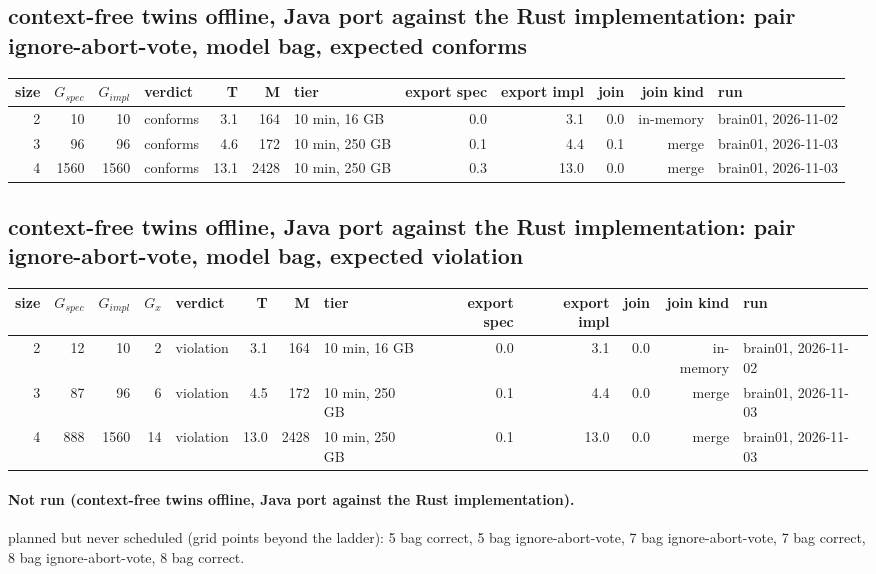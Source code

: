 \documentclass[10pt]{article}
\begin{document}
\subsection*{context-free twins offline, Java port against the Rust implementation: pair \textsf{ignore-abort-vote}, model bag, expected conforms}
\begin{longtable}{@{}rrrlrrlrrrrl@{}}
\toprule
size & $G_{\mathit{spec}}$ & $G_{\mathit{impl}}$ & verdict & T & M & tier & export spec & export impl & join & join kind & run \\
\midrule
\endhead
\color{red} 2 & 10 & 10 & conforms & 3.1 & 164 & 10 min, 16 GB & 0.0 & 3.1 & 0.0 & in-memory & brain01, 2026-11-02 \\
\color{blue} 3 & 96 & 96 & conforms & 4.6 & 172 & 10 min, 250 GB & 0.1 & 4.4 & 0.1 & merge & brain01, 2026-11-03 \\
\color{blue} 4 & 1560 & 1560 & conforms & 13.1 & 2428 & 10 min, 250 GB & 0.3 & 13.0 & 0.0 & merge & brain01, 2026-11-03 \\
\bottomrule
\end{longtable}
\subsection*{context-free twins offline, Java port against the Rust implementation: pair \textsf{ignore-abort-vote}, model bag, expected violation}
\begin{longtable}{@{}rrrrlrrlrrrrl@{}}
\toprule
size & $G_{\mathit{spec}}$ & $G_{\mathit{impl}}$ & $G_x$ & verdict & T & M & tier & export spec & export impl & join & join kind & run \\
\midrule
\endhead
\color{red} 2 & 12 & 10 & 2 & violation & 3.1 & 164 & 10 min, 16 GB & 0.0 & 3.1 & 0.0 & in-memory & brain01, 2026-11-02 \\
\color{blue} 3 & 87 & 96 & 6 & violation & 4.5 & 172 & 10 min, 250 GB & 0.1 & 4.4 & 0.0 & merge & brain01, 2026-11-03 \\
\color{blue} 4 & 888 & 1560 & 14 & violation & 13.0 & 2428 & 10 min, 250 GB & 0.1 & 13.0 & 0.0 & merge & brain01, 2026-11-03 \\
\bottomrule
\end{longtable}
\paragraph{Not run (context-free twins offline, Java port against the Rust implementation).}
planned but never scheduled (grid points beyond the ladder): 5 bag correct, 5 bag ignore-abort-vote, 7 bag ignore-abort-vote, 7 bag correct, 8 bag ignore-abort-vote, 8 bag correct.\par
\end{document}
